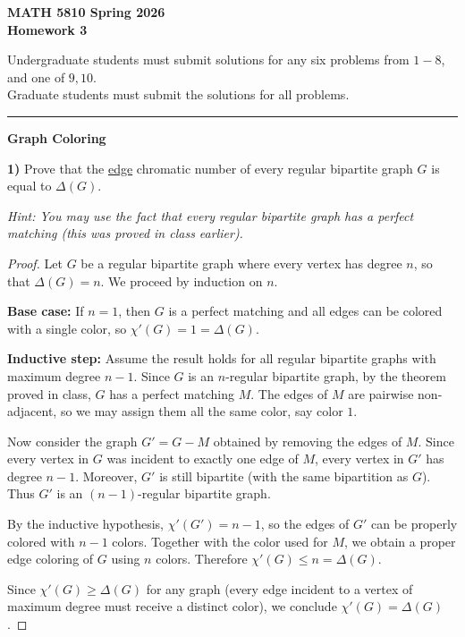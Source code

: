 \documentclass[12pt]{article}
\begin{document}
\begin{center}
{\large\bfseries MATH 5810 Spring 2026\\Homework 3}
\end{center}

\medskip

Undergraduate students must submit solutions for any six problems from $1-8$, and one of $9, 10$.\\
Graduate students must submit the solutions for all problems.

\noindent\rule{\textwidth}{0.8pt}

\begin{center}
{\large\bfseries\color{red} Graph Coloring}
\end{center}

\textbf{1)} Prove that the \underline{edge} chromatic number of every regular bipartite graph $G$ is equal to $\Delta(G)$.

\medskip

\textit{Hint: You may use the fact that every regular bipartite graph has a perfect matching (this was proved in class earlier).}

\medskip

\begin{proof}
Let $G$ be a regular bipartite graph where every vertex has degree $n$, so that $\Delta(G) = n$. We proceed by induction on $n$.

\textbf{Base case:} If $n = 1$, then $G$ is a perfect matching and all edges can be colored with a single color, so $\chi'(G) = 1 = \Delta(G)$.

\textbf{Inductive step:} Assume the result holds for all regular bipartite graphs with maximum degree $n - 1$. Since $G$ is an $n$-regular bipartite graph, by the theorem proved in class, $G$ has a perfect matching $M$. The edges of $M$ are pairwise non-adjacent, so we may assign them all the same color, say color $1$.

Now consider the graph $G' = G - M$ obtained by removing the edges of $M$. Since every vertex in $G$ was incident to exactly one edge of $M$, every vertex in $G'$ has degree $n - 1$. Moreover, $G'$ is still bipartite (with the same bipartition as $G$). Thus $G'$ is an $(n-1)$-regular bipartite graph.

By the inductive hypothesis, $\chi'(G') = n - 1$, so the edges of $G'$ can be properly colored with $n - 1$ colors. Together with the color used for $M$, we obtain a proper edge coloring of $G$ using $n$ colors. Therefore $\chi'(G) \leq n = \Delta(G)$.

Since $\chi'(G) \geq \Delta(G)$ for any graph (every edge incident to a vertex of maximum degree must receive a distinct color), we conclude $\chi'(G) = \Delta(G)$.
\end{proof}
\end{document}
